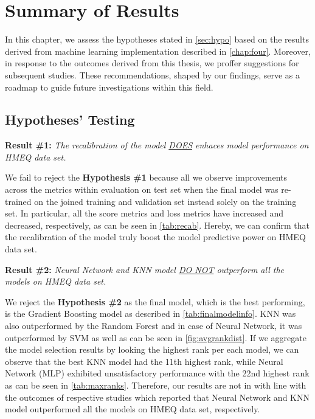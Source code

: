 \chapter{Summary of Results}
\label{chap:five}
In this chapter, we assess the hypotheses stated in \autoref{sec:hypo} based on the results derived from machine learning implementation described in \autoref{chap:four}.
Moreover, in response to the outcomes derived from this thesis, we proffer suggestions for subsequent studies. These recommendations, shaped by our findings, serve as a roadmap to guide future investigations within this field.

\section{Hypotheses' Testing}
\noindent \textbf{Result \#1:} \textit{The recalibration of the model \underline{DOES} enhaces model performance on HMEQ data set.}

We fail to reject the \textbf{Hypothesis \#1} because all we observe improvements across the metrics within evaluation on test set when the final model was re-trained on the joined training and validation set instead solely on the training set.
In particular, all the score metrics and loss metrics have increased and decreased, respectively, as can be seen in \autoref{tab:recab}. Hereby, we can confirm that the recalibration of the model truly boost the model predictive power on HMEQ data set.

\vspace{0.3cm}

\noindent \textbf{Result \#2:} \textit{Neural Network and KNN model \underline{DO NOT} outperform all the models on HMEQ data set.}

We reject the \textbf{Hypothesis \#2} as the final model, which is the best performing, is the Gradient Boosting model as described in \autoref{tab:finalmodelinfo}.
KNN was also outperformed by the Random Forest and in case of Neural Network, it was outperformed by SVM as well as can be seen in \autoref{fig:avgrankdist}.
If we aggregate the model selection results by looking the highest rank per each model, we can observe that the best KNN model had the 11th highest rank, while Neural Network (MLP) exhibited unsatisfactory performance with the 22nd highest rank as can be seen in \autoref{tab:maxranks}.
Therefore, our results are not in with line with the outcomes of respective studies \citep{serkan2021bagging,zurada2014classification} which reported that Neural Network and KNN model outperformed all the models on HMEQ data set, respectively.

